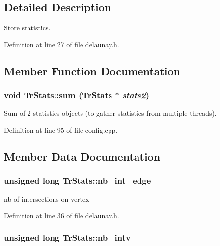 \subsection{Detailed Description}
Store statistics. 

Definition at line 27 of file delaunay.h.



\subsection{Member Function Documentation}
\hypertarget{classTrStats_adc078942b91e4940d7cd479ad141c7b5}{
\subsubsection[{sum}]{\setlength{\rightskip}{0pt plus 5cm}void TrStats::sum ({\bf TrStats} $\ast$ {\em stats2})}}
\label{classTrStats_adc078942b91e4940d7cd479ad141c7b5}


Sum of 2 statistics objects (to gather statistics from multiple threads). 



Definition at line 95 of file config.cpp.



\subsection{Member Data Documentation}
\hypertarget{classTrStats_a95aed605db899b514028a615f6ed444f}{
\subsubsection[{nb\_\-int\_\-edge}]{\setlength{\rightskip}{0pt plus 5cm}unsigned long {\bf TrStats::nb\_\-int\_\-edge}}}
\label{classTrStats_a95aed605db899b514028a615f6ed444f}


nb of intersections on vertex 



Definition at line 36 of file delaunay.h.

\hypertarget{classTrStats_aa4d9812c2ef74f9d86b4b5cc50b9766d}{
\subsubsection[{nb\_\-intv}]{\setlength{\rightskip}{0pt plus 5cm}unsigned long {\bf TrStats::nb\_\-intv}}}
\label{classTrStats_aa4d9812c2ef74f9d86b4b5cc50b9766d}



